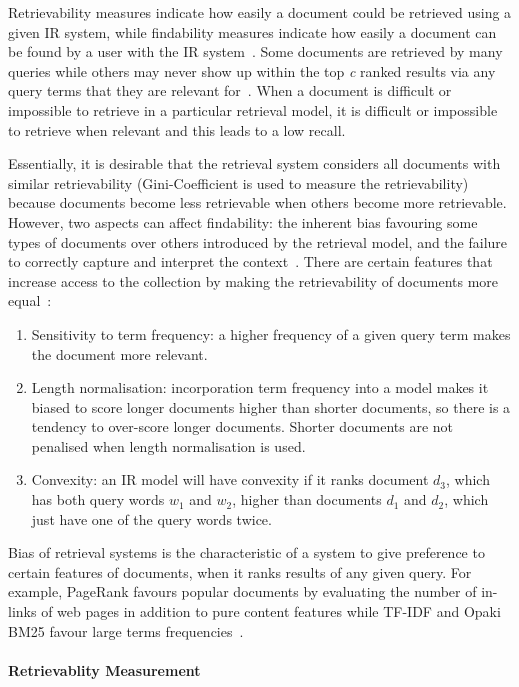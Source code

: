 Retrievability measures indicate how easily a document could be retrieved using a given IR system, while findability measures indicate how easily a document can be found by a user with the IR system~\citep{azzopardi2008retrievability}. Some documents are retrieved by many queries while others may never show up within the top \textit{c} ranked results via any query terms that they are relevant for~\citep{lupu2013patent}. When a document is difficult or impossible to retrieve in a particular retrieval model, it is difficult or impossible to retrieve when relevant and this leads to a low recall. 

Essentially, it is desirable that the retrieval system considers all documents with similar retrievability (Gini-Coefficient is used to measure the retrievability) because documents become less retrievable when others become more retrievable. However, two aspects can affect findability: the inherent bias favouring some types of documents over others introduced by the retrieval model, and the failure to correctly capture and interpret the context~\citep{bashir2009improving, bashir2011relationship}. There are certain features that increase access to the collection by making the retrievability of documents more equal~\citep{bache2010improving}:
\begin{enumerate}
\item Sensitivity to term frequency: a higher frequency of a given query term makes the document more relevant.
\item Length normalisation: incorporation term frequency into a model makes it biased to score longer documents higher than shorter documents, so there is a tendency to over-score longer documents. Shorter documents are not penalised when length normalisation is used.
\item Convexity: an IR model will have convexity if it ranks document $ d_{3} $, which has both query words $ w_{1} $ and $ w_{2} $, higher than documents $ d_{1} $ and $ d_{2} $, which just have one of the query words twice. 
\end{enumerate}
Bias of retrieval systems is the characteristic of a system to give preference to certain features of documents, when it ranks results of any given query. For example, PageRank favours popular documents by evaluating the number of in-links of web pages in addition to pure content features while TF-IDF and Opaki BM25 favour large terms frequencies~\citep{bashir2011relationship}.\\\\
\textbf{Retrievablity Measurement}
